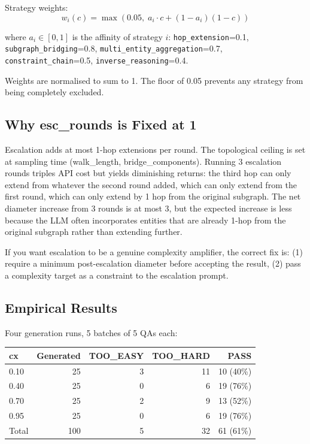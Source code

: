\documentclass[11pt,a4paper]{article}
\begin{document}
\vspace{0.5em}

Strategy weights:
\begin{equation}
w_i(c) = \max(0.05,\; a_i \cdot c + (1-a_i)(1-c))
\end{equation}

where $a_i \in [0,1]$ is the affinity of strategy $i$:
\texttt{hop\_extension}=0.1, \texttt{subgraph\_bridging}=0.8, \texttt{multi\_entity\_aggregation}=0.7, \texttt{constraint\_chain}=0.5, \texttt{inverse\_reasoning}=0.4.

Weights are normalised to sum to 1. The floor of 0.05 prevents any strategy from being completely excluded.

\subsection{Why esc\_rounds is Fixed at 1}

Escalation adds at most 1-hop extensions per round. The topological ceiling is set at sampling time (walk\_length, bridge\_components). Running 3 escalation rounds triples API cost but yields diminishing returns: the third hop can only extend from whatever the second round added, which can only extend from the first round, which can only extend by 1 hop from the original subgraph. The net diameter increase from 3 rounds is at most 3, but the expected increase is less because the LLM often incorporates entities that are already 1-hop from the original subgraph rather than extending further.

If you want escalation to be a genuine complexity amplifier, the correct fix is: (1) require a minimum post-escalation diameter before accepting the result, (2) pass a complexity target as a constraint to the escalation prompt.

\subsection{Empirical Results}

Four generation runs, 5 batches of 5 QAs each:

\begin{tabular}{lrrrr}
\toprule
cx & Generated & TOO\_EASY & TOO\_HARD & PASS \\
\midrule
0.10 & 25 & 3 & 11 & 10 (40\%) \\
0.40 & 25 & 0 &  6 & 19 (76\%) \\
0.70 & 25 & 2 &  9 & 13 (52\%) \\
0.95 & 25 & 0 &  6 & 19 (76\%) \\
\midrule
Total & 100 & 5 & 32 & 61 (61\%) \\
\bottomrule
\end{tabular}
\end{document}
